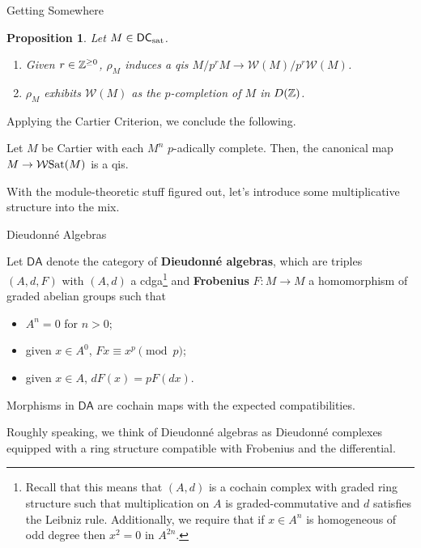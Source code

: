 \documentclass[aspectratio=1610]{beamer}
\newcommand{\DA}{\mathsf{DA}}
\newcommand{\DC}{\mathsf{DC}}
\newcommand{\sat}{\textup{sat}}
\newcommand{\Sat}{\textup{Sat}}
\newcommand{\W}{\mathcal{W}}
\newtheorem{proposition}{Proposition}
\begin{document}
\begin{frame}{Getting Somewhere}
\begin{proposition}
Let $M\in\DC_{\sat}$. 
\begin{enumerate}
\item Given $r\in\mathbb{Z}^{\geq0}$, $\rho_M$ induces a qis $M/p^rM\to\W(M)/p^r\W(M)$.

\item $\rho_M$ exhibits $\W(M)$ as the $p$-completion of $M$ in $D(\mathbb{Z})$.
\end{enumerate}
\end{proposition}

Applying the Cartier Criterion, we conclude the following.

\begin{corollary}
Let $M$ be Cartier with each $M^n$ $p$-adically complete. Then, the canonical map $M\to\W\Sat(M)$ is a qis.
\end{corollary}

With the module-theoretic stuff figured out, let's introduce some multiplicative structure into the mix.
\end{frame}

\begin{frame}{Dieudonn\'{e} Algebras}
\begin{definition}
Let $\DA$ denote the category of \textbf{Dieudonn\'{e} algebras}, which are triples $(A,d,F)$ with $(A,d)$ a cdga\footnote{Recall that this means that $(A,d)$ is a cochain complex with graded ring structure such that multiplication on $A$ is graded-commutative and $d$ satisfies the Leibniz rule. Additionally, we require that if $x\in A^n$ is homogeneous of odd degree then $x^2=0$ in $A^{2n}$.} and \textbf{Frobenius} $F: M\to M$ a homomorphism of graded abelian groups such that 
\begin{itemize}
\item $A^n=0$ for $n>0$;

\item given $x\in A^0$, $Fx\equiv x^p\pmod{p}$;

\item given $x\in A$, $dF(x)=pF(dx)$.
\end{itemize}
Morphisms in $\DA$ are cochain maps with the expected compatibilities.
\end{definition}

Roughly speaking, we think of Dieudonn\'{e} algebras as Dieudonn\'{e} complexes equipped with a ring structure compatible with Frobenius and the differential.
\end{frame}
\end{document}
